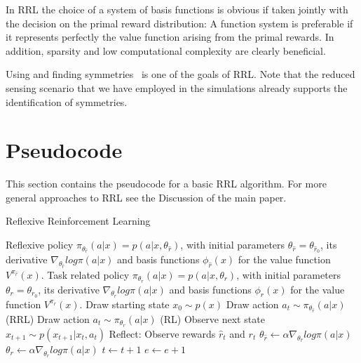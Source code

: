 \documentclass{article}
\begin{document}
In RRL the choice of a system of basis functions is obvious if taken jointly with the decision on 
the primal reward distribution: A function system is preferable if it represents perfectly 
the value function arising from the primal rewards. In addition, sparsity and 
low computational complexity are clearly beneficial. 

Using and finding symmetries~\cite{Ravindran2001,mahajan2017symmetry} is one of the goals of
RRL. Note that the reduced sensing scenario that we have employed in the simulations already
supports the identification of symmetries.







\section{Pseudocode}
This section contains the pseudocode for a basic RRL algorithm.
For more general approaches to RRL see the Discussion of the main paper.

\renewcommand{\algorithmicrequire}{\textbf{Input:}}
\renewcommand{\algorithmicensure}{\textbf{Output:}}

\begin{algorithm}
\caption{Reflexive Reinforcement Learning}
\begin{algorithmic}
\REQUIRE Reflexive policy $\pi_{\theta_{\hat{r}}} (a|x)=p(a|x, \theta_{\hat{r}})$, with initial parameters $\theta_{\hat{r}}=\theta_{\hat{r}_0}$, its derivative $\nabla_{\theta_{\hat{r}}} log \pi(a|x)$ and basis functions $\phi_{\hat{r}}(x)$ for the value function $V^{\pi_{\hat{r}}}(x)$. Task related policy $\pi_{\theta_{r}} (a|x)=p(a|x, \theta_{r})$, with initial parameters $\theta_{r}=\theta_{{r}_0}$, its derivative $\nabla_{\theta_{r}} log \pi(a|x)$ and basis functions $\phi_{r}(x)$ for the value function $V^{\pi_{r}}(x)$.
\STATE Draw starting state $x_0 \sim p(x)$
	\STATE Draw action $a_t \sim \pi_{\theta_{\hat{r}}}(a|x)$ \quad (RRL)
\ELSE 
	\STATE Draw action $a_t \sim \pi_{\theta_{r}}(a|x)$ \quad (RL)
\ENDIF
\STATE Observe next state $x_{t+1} \sim p(x_{t+1}| x_t, a_t)$
\STATE Reflect: Observe rewards $\hat{r}_t$ and $r_t$
\STATE $\theta_{\hat{r}} \leftarrow \alpha \nabla_{\theta_{\hat{r}}} log \pi(a|x) $
\STATE $\theta_{r} \leftarrow \alpha \nabla_{\theta_{r}} log \pi(a|x) $
\STATE $t \leftarrow t+1$
\ENDWHILE
\STATE $e \leftarrow e+1$
\ENDWHILE
\end{algorithmic}
\end{algorithm}
\end{document}
